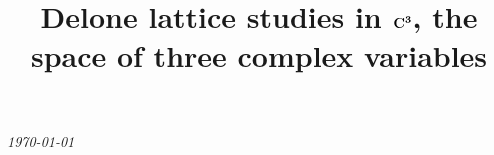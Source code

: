 \documentclass[]{iucr}              %
\numberwithin{equation}{section}
\newcommand{\CIII}[0]{$\bf{C^{3}}$}
\begin{document}
	
	
	
	
	
	
	
	
	
	
	
	{\LARGE \emph{\today}} \\
	\title{Delone lattice studies in \CIII, the space of three complex variables}
	
	
\end{document}
